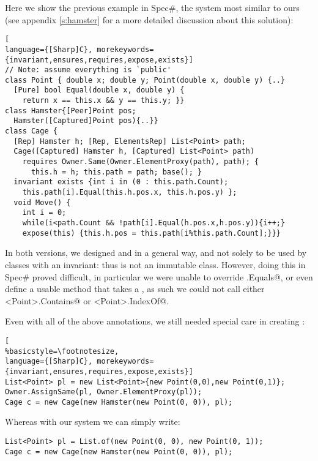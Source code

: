 Here we show the previous example in Spec\#, the system most similar to ours (see appendix \ref{s:hamster} for a more detailed discussion about this solution):
\begin{lstlisting}[
language={[Sharp]C}, morekeywords={invariant,ensures,requires,expose,exists}]
// Note: assume everything is `public'
class Point { double x; double y; Point(double x, double y) {..}
  [Pure] bool Equal(double x, double y) {
    return x == this.x && y == this.y; }}
class Hamster{[Peer]Point pos; 
  Hamster([Captured]Point pos){..}}
class Cage {
  [Rep] Hamster h; [Rep, ElementsRep] List<Point> path;
  Cage([Captured] Hamster h, [Captured] List<Point> path)
    requires Owner.Same(Owner.ElementProxy(path), path); {
      this.h = h; this.path = path; base(); }
  invariant exists {int i in (0 : this.path.Count);
    this.path[i].Equal(this.h.pos.x, this.h.pos.y) };
  void Move() {
    int i = 0;
    while(i<path.Count && !path[i].Equal(h.pos.x,h.pos.y)){i++;}
    expose(this) {this.h.pos = this.path[i%this.path.Count];}}}
\end{lstlisting}

In both versions, we designed \Q@Point@ and \Q@Hamster@ in a general way, and not solely to be used by classes with an invariant: thus \Q@Point@ is not an immutable class. However, doing this in Spec\# proved difficult, in particular we were unable to override \Q@Object.Equals@, or even define a usable \Q@equals@ method that takes a \Q@Point@, as such we could not call either \Q@List<Point>.Contains@ or \Q@List<Point>.IndexOf@.
 
Even with all of the above annotations, we still needed special care in creating \Q@Cage@s:\vspace{-1.860px}%
\begin{lstlisting}[
%basicstyle=\footnotesize,
language={[Sharp]C}, morekeywords={invariant,ensures,requires,expose,exists}]
List<Point> pl = new List<Point>{new Point(0,0),new Point(0,1)};
Owner.AssignSame(pl, Owner.ElementProxy(pl));
Cage c = new Cage(new Hamster(new Point(0, 0)), pl);
\end{lstlisting}

Whereas with our system we can simply write:
\begin{lstlisting}
List<Point> pl = List.of(new Point(0, 0), new Point(0, 1));
Cage c = new Cage(new Hamster(new Point(0, 0)), pl);
\end{lstlisting}

